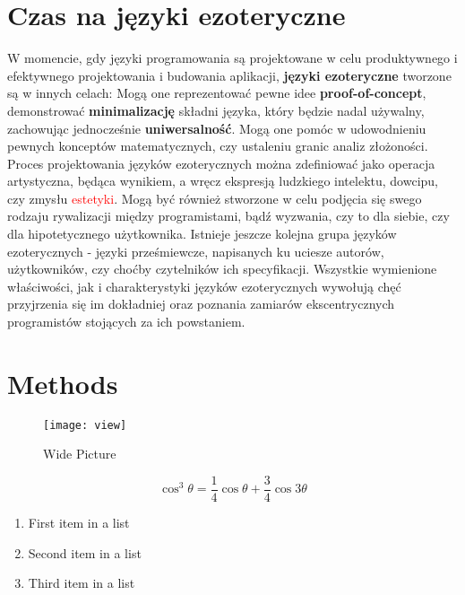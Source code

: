 \documentclass[fleqn,10pt]{SelfArx} %
\begin{document}
\section{Czas na języki ezoteryczne}
	W momencie, gdy języki programowania są projektowane w celu produktywnego i efektywnego
	projektowania i budowania aplikacji, \textbf{języki ezoteryczne} tworzone są w innych celach: Mogą one reprezentować pewne idee \textbf{proof-of-concept},
	demonstrować \textbf{minimalizację} składni języka, który będzie nadal używalny, zachowując jednocześnie \textbf{uniwersalność}.
	Mogą one pomóc w udowodnieniu pewnych konceptów matematycznych, czy ustaleniu granic analiz złożoności.
	Proces projektowania języków ezoterycznych można zdefiniować jako operacja artystyczna,
	będąca wynikiem, a wręcz ekspresją ludzkiego intelektu, dowcipu, czy zmysłu \textcolor{red}{estetyki}.
	Mogą być również stworzone w celu podjęcia się swego rodzaju rywalizacji między programistami, bądź wyzwania, czy to dla siebie, czy dla hipotetycznego użytkownika.
	Istnieje jeszcze kolejna grupa języków ezoterycznych - języki prześmiewcze, napisanych ku uciesze autorów, użytkowników, czy choćby czytelników ich specyfikacji.\cite{morr2015esoteric}
	Wszystkie wymienione właściwości, jak i charakterystyki języków ezoterycznych wywołują chęć przyjrzenia się im dokładniej oraz poznania zamiarów ekscentrycznych programistów stojących za ich powstaniem.



\section{Methods}

\begin{figure*}[ht]\centering %
	\texttt{[image: view]}
	\caption{Wide Picture}
	\label{fig:view}
\end{figure*}

\lipsum[4] %

\begin{equation}
	\cos^3 \theta =\frac{1}{4}\cos\theta+\frac{3}{4}\cos 3\theta
	\label{eq:refname2}
\end{equation}

\lipsum[5] %

\begin{enumerate}[noitemsep] %
	\item First item in a list
	\item Second item in a list
	\item Third item in a list
\end{enumerate}
\end{document}
